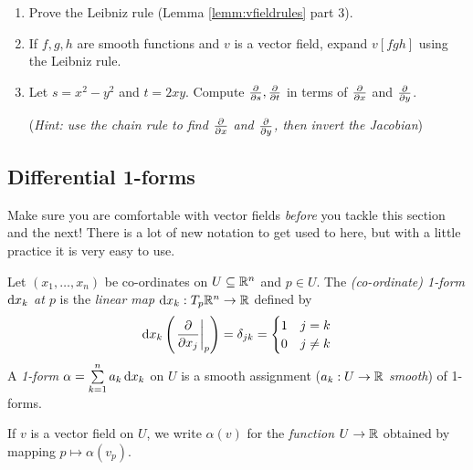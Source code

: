 \begin{exercises}
\begin{enumerate}
	  
	  \item Prove the Leibniz rule (Lemma \ref{lemm:vfieldrules} part 3).
	  
	  
	 	\item If $f,g,h$ are smooth functions and $v$ is a vector field, expand $v[fgh]$ using the Leibniz rule.
	  
	  
	  \item Let $s=x^2-y^2$ and $t=2xy$. Compute $\frac{\partial }{\partial s},\frac{\partial }{\partial t}$ in terms of $\frac{\partial }{\partial x}$ and $\frac{\partial }{\partial y}$.\par
	  (\emph{Hint: use the chain rule to find $\frac{\partial }{\partial x}$ and $\frac{\partial }{\partial y}$, then invert the Jacobian})
	  
	\end{enumerate}
\end{exercises}

\clearpage



\subsection{Differential 1-forms}\label{sec:1form}

Make sure you are comfortable with vector fields \emph{before} you tackle this section and the next! There is a lot of new notation to get used to here, but with a little practice it is very easy to use. 

\begin{defn}{}{}
	Let $(x_1,\ldots,x_n)$ be co-ordinates on $U\subseteq\mathbb{R}^n$ and $p\in U$. The \emph{(co-ordinate) 1-form ${\mathrm{d} x}_k$ at $p$} is the \emph{linear map\footnotemark} ${\mathrm{d} x}_k:T_p\mathbb{R}^n\to\mathbb{R}$ defined by
	\[
		{\mathrm{d} x}_k\left(\left.\frac{\partial }{\partial x_j}\right|_{p}\right)=\delta_{jk}=
		\begin{cases}
			1&j=k\\
			0&j\neq k
		\end{cases}
	\]
	A \emph{1-form} $\alpha=\sum\limits_{k=1}^n a_k\,{\mathrm{d} x}_k$ on $U$ is a smooth assignment ($a_k:U\to\mathbb{R}$ \emph{smooth}) of 1-forms.\par
	If $v$ is a vector field on $U$, we write $\alpha(v)$ for the \emph{function} $U\to\mathbb{R}$ obtained by mapping $p\mapsto\alpha(v_p)$.
\end{defn}




